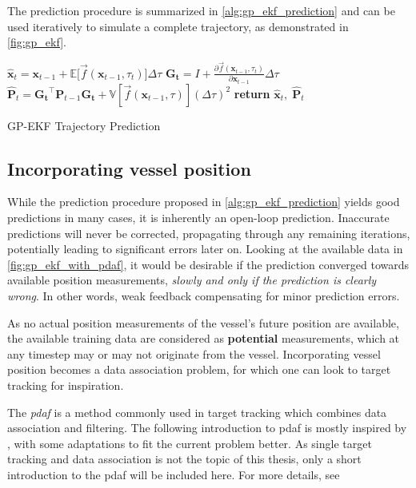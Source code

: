 The prediction procedure is summarized in \cref{alg:gp_ekf_prediction} and can be used iteratively to simulate a complete trajectory, as demonstrated in \cref{fig:gp_ekf}.

\begin{algorithm}[h]
    \begin{algorithmic}[1]
        \State $\hat{\boldsymbol{x}}_{t} = \boldsymbol{x}_{t-1} + \mathbb{E}\big[\vec{f}(\boldsymbol{x}_{t-1}, \tau_t)\big] \Delta \tau$
        \State $\boldsymbol{G_t} = I + \frac{\partial \vec{f}(\boldsymbol{x}_{t-1}, \tau_t)}{\partial \boldsymbol{x}_{t-1}} \Delta \tau$
        \State $\hat{\boldsymbol{P}}_t = \boldsymbol{G_t}^\intercal \boldsymbol{P}_{t-1} \boldsymbol{G_t} +\mathbb{V}[\vec{f}(\boldsymbol{x}_{t-1}, \tau)] (\Delta \tau)^2$
        \State \textbf{return} $\hat{\boldsymbol{x}}_t, \; \hat{\boldsymbol{P}}_t$
        \EndProcedure
    \end{algorithmic}
    \caption{GP-EKF Trajectory Prediction}
    \label{alg:gp_ekf_prediction}
\end{algorithm}



\subsection{Incorporating vessel position}
While the prediction procedure proposed in \cref{alg:gp_ekf_prediction} yields good predictions in many cases, it is inherently an open-loop prediction. Inaccurate predictions will never be corrected, propagating through any remaining iterations, potentially leading to significant errors later on. Looking at the available data in \cref{fig:gp_ekf_with_pdaf}, it would be desirable if the prediction converged towards available position measurements, \textit{slowly and only if the prediction is clearly wrong}. In other words, weak feedback compensating for minor prediction errors.

As no actual position measurements of the vessel's future position are available, the available training data are considered as \textbf{potential} measurements, which at any timestep may or may not originate from the vessel. Incorporating vessel position becomes a data association problem, for which one can look to target tracking for inspiration.

The \textit{\acrfull{pdaf}} is a method commonly used in target tracking which combines data association and filtering. The following introduction to \acrshort{pdaf} is mostly inspired by \cite{sensorfusjon}, with some adaptations to fit the current problem better. As single target tracking and data association is not the topic of this thesis, only a short introduction to the \acrshort{pdaf} will be included here. For more details, see \cite{sensorfusjon,bar1995multitarget}

